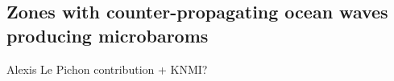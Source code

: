 \subsection{Zones with counter-propagating ocean waves producing microbaroms}

Alexis Le Pichon contribution
+ KNMI?
